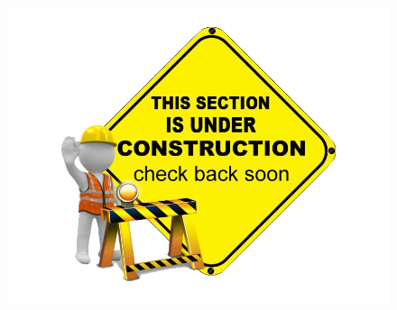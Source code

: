 \documentclass[../main.tex]{subfiles}
\begin{document}
\begin{figure}[h]
    \centering
    \includegraphics{Images/workinprogress.png}
    \caption*{}
    \label{fig:my_label}
\end{figure}
\end{document}
